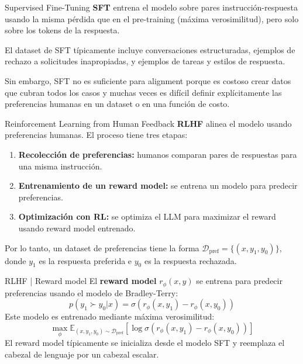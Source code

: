 \documentclass{beamer}
\begin{document}
\begin{frame}{Supervised Fine-Tuning}
    \textbf{SFT} entrena el modelo sobre pares instrucción-respuesta usando la misma pérdida que en el pre-training (máxima verosimilitud), pero solo sobre los tokens de la respuesta.

    El dataset de SFT típicamente incluye conversaciones estructuradas, ejemplos de rechazo a solicitudes inapropiadas, y ejemplos de tareas y estilos de respuesta.

    Sin embargo, SFT no es suficiente para alignment porque es costoso crear datos que cubran todos los casos y muchas veces es difícil definir explícitamente las preferencias humanas en un dataset o en una función de costo.
\end{frame}

\begin{frame}{Reinforcement Learning from Human Feedback}
    \textbf{RLHF} alinea el modelo usando preferencias humanas. El proceso tiene tres etapas:
    \begin{enumerate}
        \item \textbf{Recolección de preferencias:} humanos comparan pares de respuestas para una misma instrucción.
        \item \textbf{Entrenamiento de un reward model:} se entrena un modelo para predecir preferencias.
        \item \textbf{Optimización con RL:} se optimiza el LLM para maximizar el reward usando reward model entrenado.
    \end{enumerate}
    Por lo tanto, un dataset de preferencias tiene la forma $\mathcal{D}_{\text{pref}} = \{(x, y_1, y_0)\}$, donde $y_1$ es la respuesta preferida e $y_0$ es la respuesta rechazada.
\end{frame}

\begin{frame}{RLHF | Reward model}
    El \textbf{reward model} $r_\phi(x, y)$ se entrena para predecir preferencias usando el modelo de Bradley-Terry:
    \begin{equation*}
        p(y_1 \succ y_0 | x) = \sigma(r_\phi(x, y_1) - r_\phi(x, y_0))
    \end{equation*}
    Este modelo es entrenado mediante máxima verosimilitud:
    \begin{equation*}
        \max_\phi \mathbb{E}_{(x, y_1, y_0) \sim \mathcal{D}_{\text{pref}}} \left[\log \sigma(r_\phi(x, y_1) - r_\phi(x, y_0))\right]
    \end{equation*}
    El reward model típicamente se inicializa desde el modelo SFT y reemplaza el cabezal de lenguaje por un cabezal escalar.
\end{frame}
\end{document}
